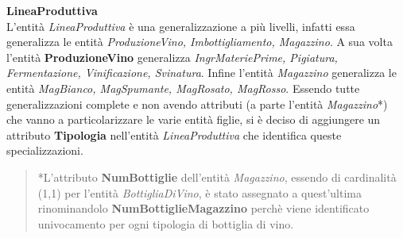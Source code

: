 \begin{flushleft}
	\textbf{\large{LineaProduttiva}}\\
	L'entità \emph{LineaProduttiva} è una generalizzazione a più livelli, infatti essa generalizza le entità \emph{ProduzioneVino, Imbottigliamento, Magazzino}. A sua volta l'entità \textbf{ProduzioneVino} generalizza \emph{IngrMateriePrime, Pigiatura, Fermentazione, Vinificazione, Svinatura}. Infine l'entità \emph{Magazzino} generalizza le entità \emph{MagBianco, MagSpumante, MagRosato, MagRosso}. Essendo tutte generalizzazioni complete e non avendo attributi (a parte l'entità \emph{Magazzino}*) che vanno a particolarizzare le varie entità figlie, si è deciso di aggiungere un attributo \textbf{Tipologia} nell'entità \emph{LineaProduttiva} che identifica queste specializzazioni.
\end{flushleft}

\begin{verse}
	*L'attributo \textbf{NumBottiglie} dell'entità \emph{Magazzino}, essendo di cardinalità (1,1) per l'entità \emph{BottigliaDiVino}, è stato assegnato a quest'ultima rinominandolo \textbf{NumBottiglieMagazzino} perchè viene identificato univocamento per ogni tipologia di bottiglia di vino.
\end{verse}